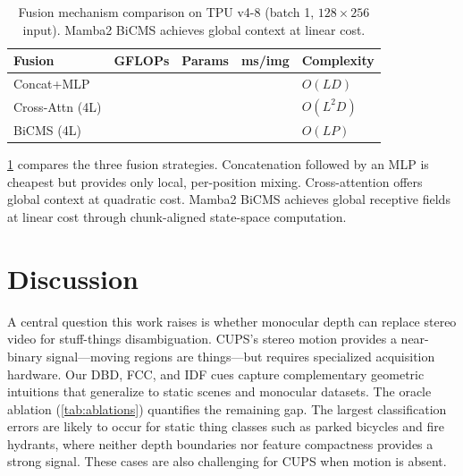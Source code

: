 \documentclass[10pt,twocolumn,letterpaper]{article}
\begin{document}
\begin{table}[t]
\centering
\caption{Fusion mechanism comparison on TPU v4-8 (batch 1, $128 {\times} 256$ input). Mamba2 BiCMS achieves global context at linear cost.}
\label{tab:compute}
\setlength{\tabcolsep}{3pt}
\begin{tabular}{lcccl}
\toprule
Fusion & GFLOPs & Params & ms/img & Complexity \\
\midrule
Concat+MLP & \underline{\hspace{1em}} & \underline{\hspace{1em}} & \underline{\hspace{1em}} & $O(LD)$ \\
Cross-Attn (4L) & \underline{\hspace{1em}} & \underline{\hspace{1em}} & \underline{\hspace{1em}} & $O(L^2D)$ \\
BiCMS (4L) & \underline{\hspace{1em}} & \underline{\hspace{1em}} & \underline{\hspace{1em}} & $O(LP)$ \\
\bottomrule
\end{tabular}
\end{table}

\cref{tab:compute} compares the three fusion strategies. Concatenation followed by an MLP is cheapest but provides only local, per-position mixing. Cross-attention offers global context at quadratic cost. Mamba2 BiCMS achieves global receptive fields at linear cost through chunk-aligned state-space computation.


\section{Discussion}
\label{sec:discussion}

A central question this work raises is whether monocular depth can replace stereo video for stuff-things disambiguation. CUPS's stereo motion provides a near-binary signal---moving regions are things---but requires specialized acquisition hardware. Our DBD, FCC, and IDF cues capture complementary geometric intuitions that generalize to static scenes and monocular datasets. The oracle ablation (\cref{tab:ablations}) quantifies the remaining gap. The largest classification errors are likely to occur for static thing classes such as parked bicycles and fire hydrants, where neither depth boundaries nor feature compactness provides a strong signal. These cases are also challenging for CUPS when motion is absent.
\end{document}
